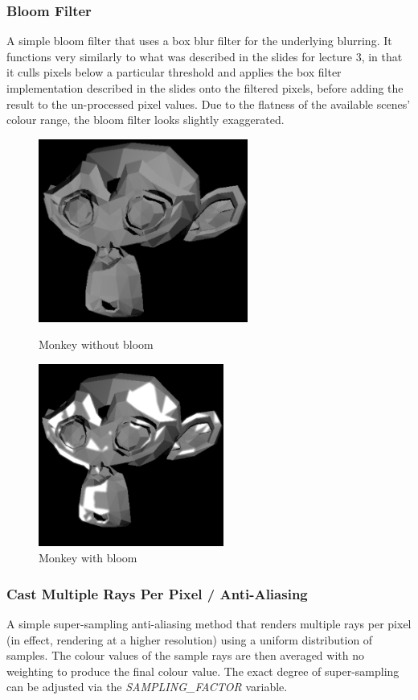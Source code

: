 \documentclass{article}
\begin{document}
    \subsubsection{Bloom Filter}
    A simple bloom filter that uses a box blur filter for the underlying blurring. It functions very similarly 
    to what was described in the slides for lecture 3, in that it culls pixels below a particular threshold 
    and applies the box filter implementation described in the slides onto the filtered pixels, before adding 
    the result to the un-processed pixel values. Due to the flatness of the available scenes' colour range,
    the bloom filter looks slightly exaggerated.

    \begin{figure}[!htb]
          \includegraphics[width=\linewidth, height=6cm]{images/monkey_no_bloom}
          \caption*{Monkey without bloom}
        \endminipage\hfill
          \includegraphics[width=\linewidth, height=6cm]{images/monkey_bloom}
          \caption*{Monkey with bloom}
        \endminipage
    \end{figure}
    
    \subsubsection{Cast Multiple Rays Per Pixel / Anti-Aliasing}
    A simple super-sampling anti-aliasing method that renders multiple rays per pixel (in effect, rendering 
    at a higher resolution) using a uniform distribution of samples. The colour values of the sample rays are 
    then averaged with no weighting to produce the final colour value. The exact degree of super-sampling can 
    be adjusted via the \emph{SAMPLING\_FACTOR} variable.
    
\end{document}
